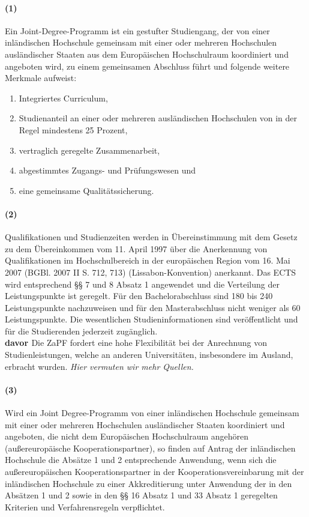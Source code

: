 \documentclass[a4paper]{scrartcl}
\begin{document}
\paragraph{(1)} Ein Joint-Degree-Programm ist ein gestufter Studiengang, der von einer
inländischen Hochschule gemeinsam mit einer oder mehreren Hochschulen ausländischer Staaten aus dem Europäischen Hochschulraum koordiniert und angeboten wird, zu einem gemeinsamen Abschluss führt und folgende weitere Merkmale aufweist:
\begin{enumerate}
\item Integriertes Curriculum,
\item Studienanteil an einer oder mehreren ausländischen Hochschulen von in
der Regel mindestens 25 Prozent,
\item vertraglich geregelte Zusammenarbeit,
\item abgestimmtes Zugangs- und Prüfungswesen und
\item eine gemeinsame Qualitätssicherung.
\end{enumerate}
\paragraph{(2)} Qualifikationen und Studienzeiten werden in Übereinstimmung mit dem
Gesetz zu dem Übereinkommen vom 11. April 1997 über die Anerkennung von Qualifikationen im Hochschulbereich in der europäischen Region vom 16. Mai 2007 (BGBl. 2007 II S. 712, 713) (Lissabon-Konvention) anerkannt. Das ECTS wird entsprechend §§ 7 und 8 Absatz 1 angewendet und die Verteilung der Leistungspunkte ist geregelt. Für den Bachelorabschluss sind 180 bis 240 Leistungspunkte nachzuweisen und für den Masterabschluss nicht weniger als 60 Leistungspunkte. Die wesentlichen Studieninformationen sind veröffentlicht und für die Studierenden jederzeit zugänglich.\\

\textcolor{Bernd}{\textbf{\cite{RESO: SoSe2013-Anerkennung} davor \cite{RESO: WiSe2008-RL}} Die ZaPF fordert eine hohe Flexibilität bei der Anrechnung von Studienleistungen,
welche an anderen Universitäten, insbesondere im Ausland, erbracht wurden.}
\textcolor{Brutus}{\emph{Hier vermuten wir mehr Quellen.}}

\paragraph{(3)} Wird ein Joint Degree-Programm von einer inländischen Hochschule
gemeinsam mit einer oder mehreren Hochschulen ausländischer Staaten koordiniert und angeboten, die nicht dem Europäischen Hochschulraum angehören (außereuropäische Kooperationspartner), so finden auf Antrag der inländischen Hochschule die Absätze 1 und 2 entsprechende Anwendung, wenn sich die außereuropäischen Kooperationspartner in der
Kooperationsvereinbarung mit der inländischen Hochschule zu einer Akkreditierung unter Anwendung der in den Absätzen 1 und 2 sowie in den §§ 16 Absatz 1 und 33 Absatz 1 geregelten Kriterien und Verfahrensregeln verpflichtet.
\end{document}
